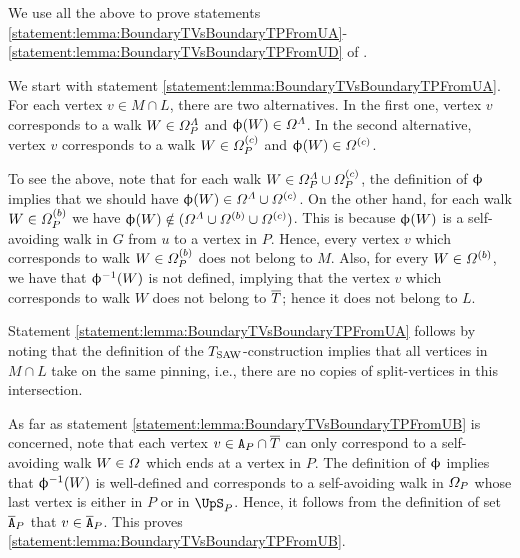 \documentclass[11pt,reqno]{amsart}
\numberwithin{equation}{section}
\newcommand{\blue}[1]{{\color{blue}#1}}
\newcommand{\cadmiumorange}[1]{{\color{cadmiumorange}#1}}
\newcommand{\electricviolet}[1]{{\color{electricviolet}#1}}
\newcommand{\goldenbrown}[1]{{\color{goldenbrown}#1}}
\newcommand{\red}[1]{{\color{red}#1}}
\newcommand{\Tsaw}{T_{\rm SAW}}
\renewcommand{\blue}[1]{#1}
\renewcommand{\cadmiumorange}[1]{#1}
\renewcommand{\electricviolet}[1]{#1}
\renewcommand{\goldenbrown}[1]{#1}
\renewcommand{\red}[1]{#1}
\newcommand{\kL}{\cadmiumorange{L}}
\newcommand{\kM}{\cadmiumorange{M}}
\newcommand{\kP}{\goldenbrown{P}}
\newcommand{\ku}{\red{u}}
\newcommand{\kv}{\electricviolet{v}}
\newcommand{\kW}{\blue{W}}
\renewcommand{\kL}{L}
\renewcommand{\kM}{M}
\renewcommand{\kP}{P}
\renewcommand{\ku}{u}
\renewcommand{\kv}{v}
\renewcommand{\kW}{W}
\begin{document}
We use all the above to prove statements \ref{statement:lemma:BoundaryTVsBoundaryTPFromUA}-\ref{statement:lemma:BoundaryTVsBoundaryTPFromUD}
of .




We start with statement \ref{statement:lemma:BoundaryTVsBoundaryTPFromUA}.   For each vertex 
$\kv\in M\cap \kL$, there are two  alternatives. In the first one, vertex $\kv$ corresponds to a walk 
$\kW\in \sawpaths^{\Lambda}_{\kP}$ and $\BBijection(\kW)\in \sawpaths^{\Lambda}$. In the second 
alternative, vertex $\kv$ corresponds to a walk $\kW\in \sawpaths^{(c)}_{\kP}$ and  $\BBijection(\kW)\in \sawpaths^{(c)}$.



To see  the above,  note that for each walk $\kW\in \sawpaths^{\Lambda}_{\kP}\cup\sawpaths^{(c)}_{\kP}$, the definition
of  $\upphi$ implies that we should have  $\BBijection(\kW)\in \sawpaths^{\Lambda}\cup \sawpaths^{(c)}$.  
On the other hand, for each walk $\kW\in \sawpaths^{(b)}_{\kP}$ we have 
$\BBijection(\kW)\notin (\sawpaths^{\Lambda}\cup \sawpaths^{(b)} \cup\sawpaths^{(c)})$.  This is because 
$\BBijection(\kW)$ is a self-avoiding walk in $G$ from $\ku$ to a vertex in $\kP$. Hence, every
vertex $\kv$ which corresponds  to walk $\kW\in \sawpaths^{(b)}_{\kP}$ does not belong to $\kM$. 
Also, for every $\kW\in \sawpaths^{(b)}$,   we have that $\BBijection^{-1}(\kW)$ is not defined, 
implying  that the vertex $\kv$ which corresponds  to walk $\kW$ does not belong to $\overline{T}$;
hence it does not belong  to $\kL$.



Statement \ref{statement:lemma:BoundaryTVsBoundaryTPFromUA} follows by noting that 
the definition of the $\Tsaw$-construction implies that all vertices in $M\cap \kL$ take on the same 
 pinning, i.e.,   there are  no copies of split-vertices in this intersection. 
 
 
As far as statement \ref{statement:lemma:BoundaryTVsBoundaryTPFromUB} is concerned, note 
that each vertex $\kv\in \cpT \cap \SMTPu$ can only
correspond to a self-avoiding walk $\kW\in \sawpaths$ which ends at a vertex in $\kP$. The definition of 
$\upphi$ implies that $\BBijection^{-1}(\kW)$ is well-defined and corresponds to  a self-avoiding walk in 
$\sawpaths_{\kP}$ whose last vertex is  either in $\kP$ or in $\ssplit_{\kP}$. Hence, it follows from the
definition of set $\cpTP$ that $\kv\in \cpTP$. This proves \ref{statement:lemma:BoundaryTVsBoundaryTPFromUB}.
\end{document}
